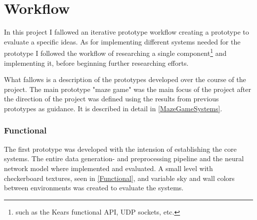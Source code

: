 
\chapter{Workflow}
In this project I fallowed an iterative prototype workflow creating a prototype to evaluate a specific ideas. As for implementing different systems needed for the prototype I followed the workflow of researching a single component\footnote{such as the Kears functional API, UDP sockets, etc.} and implementing it, before beginning further researching efforts.

What fallows is a description of the prototypes developed over the course of the project. The main prototype "maze game" was the main focus of the project after the direction of the project was defined using the results from previous prototypes as guidance. It is described in detail in \cref{MazeGameSystems}.


\subsection{Functional}
The first prototype was developed with the intension of establishing the core systems. The entire data generation- and preprocessing pipeline and the neural network model where implemented and evaluated. A small level with checkerboard textures, seen in \cref{Functional}, and variable sky and wall colors between environments was created to evaluate the systems. 

